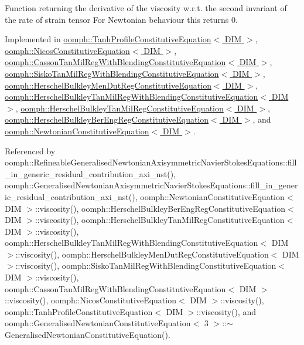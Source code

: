 Function returning the derivative of the viscosity w.\+r.\+t. the second invariant of the rate of strain tensor For Newtonian behaviour this returns 0. 

Implemented in \hyperlink{classoomph_1_1TanhProfileConstitutiveEquation_a5151261b6ec1c3f29f7ee085db955c2f}{oomph\+::\+Tanh\+Profile\+Constitutive\+Equation$<$ D\+I\+M $>$}, \hyperlink{classoomph_1_1NicosConstitutiveEquation_a470905abb0522dd441e1e32fbaabb9c3}{oomph\+::\+Nicos\+Constitutive\+Equation$<$ D\+I\+M $>$}, \hyperlink{classoomph_1_1CassonTanMilRegWithBlendingConstitutiveEquation_addb110a4246eb4e7bdcef5d017123911}{oomph\+::\+Casson\+Tan\+Mil\+Reg\+With\+Blending\+Constitutive\+Equation$<$ D\+I\+M $>$}, \hyperlink{classoomph_1_1SiskoTanMilRegWithBlendingConstitutiveEquation_a66579b2c9c19b7ca3168fe58202e8591}{oomph\+::\+Sisko\+Tan\+Mil\+Reg\+With\+Blending\+Constitutive\+Equation$<$ D\+I\+M $>$}, \hyperlink{classoomph_1_1HerschelBulkleyMenDutRegConstitutiveEquation_a7329879e20bf130cfb1f94d19d62b440}{oomph\+::\+Herschel\+Bulkley\+Men\+Dut\+Reg\+Constitutive\+Equation$<$ D\+I\+M $>$}, \hyperlink{classoomph_1_1HerschelBulkleyTanMilRegWithBlendingConstitutiveEquation_a62a903bc649a75dd1042923e624e2ea4}{oomph\+::\+Herschel\+Bulkley\+Tan\+Mil\+Reg\+With\+Blending\+Constitutive\+Equation$<$ D\+I\+M $>$}, \hyperlink{classoomph_1_1HerschelBulkleyTanMilRegConstitutiveEquation_a7b54c8c6374ba0bd80f5d51768701dc0}{oomph\+::\+Herschel\+Bulkley\+Tan\+Mil\+Reg\+Constitutive\+Equation$<$ D\+I\+M $>$}, \hyperlink{classoomph_1_1HerschelBulkleyBerEngRegConstitutiveEquation_ac02f227a7ca7fcd65fe0f9c0baff417d}{oomph\+::\+Herschel\+Bulkley\+Ber\+Eng\+Reg\+Constitutive\+Equation$<$ D\+I\+M $>$}, and \hyperlink{classoomph_1_1NewtonianConstitutiveEquation_aa4160d3707e40c7478047f5800733225}{oomph\+::\+Newtonian\+Constitutive\+Equation$<$ D\+I\+M $>$}.



Referenced by oomph\+::\+Refineable\+Generalised\+Newtonian\+Axisymmetric\+Navier\+Stokes\+Equations\+::fill\+\_\+in\+\_\+generic\+\_\+residual\+\_\+contribution\+\_\+axi\+\_\+nst(), oomph\+::\+Generalised\+Newtonian\+Axisymmetric\+Navier\+Stokes\+Equations\+::fill\+\_\+in\+\_\+generic\+\_\+residual\+\_\+contribution\+\_\+axi\+\_\+nst(), oomph\+::\+Newtonian\+Constitutive\+Equation$<$ D\+I\+M $>$\+::viscosity(), oomph\+::\+Herschel\+Bulkley\+Ber\+Eng\+Reg\+Constitutive\+Equation$<$ D\+I\+M $>$\+::viscosity(), oomph\+::\+Herschel\+Bulkley\+Tan\+Mil\+Reg\+Constitutive\+Equation$<$ D\+I\+M $>$\+::viscosity(), oomph\+::\+Herschel\+Bulkley\+Tan\+Mil\+Reg\+With\+Blending\+Constitutive\+Equation$<$ D\+I\+M $>$\+::viscosity(), oomph\+::\+Herschel\+Bulkley\+Men\+Dut\+Reg\+Constitutive\+Equation$<$ D\+I\+M $>$\+::viscosity(), oomph\+::\+Sisko\+Tan\+Mil\+Reg\+With\+Blending\+Constitutive\+Equation$<$ D\+I\+M $>$\+::viscosity(), oomph\+::\+Casson\+Tan\+Mil\+Reg\+With\+Blending\+Constitutive\+Equation$<$ D\+I\+M $>$\+::viscosity(), oomph\+::\+Nicos\+Constitutive\+Equation$<$ D\+I\+M $>$\+::viscosity(), oomph\+::\+Tanh\+Profile\+Constitutive\+Equation$<$ D\+I\+M $>$\+::viscosity(), and oomph\+::\+Generalised\+Newtonian\+Constitutive\+Equation$<$ 3 $>$\+::$\sim$\+Generalised\+Newtonian\+Constitutive\+Equation().

